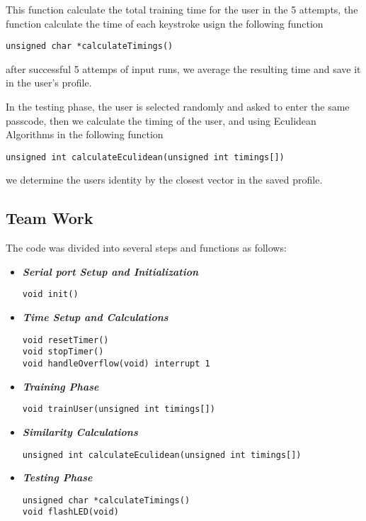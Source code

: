 \documentclass[runningheads]{llncs}
\begin{document}
This function calculate the total training time for the user in the 5 attempts,
the function calculate the time of each keystroke usign the following function
\begin{lstlisting}[style=CStyle]
unsigned char *calculateTimings()
\end{lstlisting}
after successful 5 attemps of input runs, we average the resulting time and save it in the user's profile. \newline \newline 

In the testing phase, the user is selected randomly and asked to enter the same passcode,
then we calculate the timing of the user, and using Eculidean Algorithms in the following function
\begin{lstlisting}[style=CStyle]
unsigned int calculateEculidean(unsigned int timings[])
\end{lstlisting}
we determine the users identity by the closest vector in the saved profile. \newline


\subsection{Team Work}

The code was divided into several steps and functions as follows:
\begin{itemize}
  \setlength\itemsep{2em}

\item \textbf{\textit{Serial port Setup and Initialization}}
\begin{lstlisting}[style=CStyle]
void init()
\end{lstlisting}


\item \textbf{\textit{Time Setup and Calculations}}
\begin{lstlisting}[style=CStyle]
void resetTimer()
void stopTimer()
void handleOverflow(void) interrupt 1
\end{lstlisting}


\item \textbf{\textit{Training Phase}}
\begin{lstlisting}[style=CStyle]
void trainUser(unsigned int timings[])
\end{lstlisting}


\item \textbf{\textit{Similarity Calculations }}
\begin{lstlisting}[style=CStyle]
unsigned int calculateEculidean(unsigned int timings[])
\end{lstlisting}

\item \textbf{\textit{Testing Phase}}
\begin{lstlisting}[style=CStyle]
unsigned char *calculateTimings()
void flashLED(void)
\end{lstlisting}
\end{itemize}
\end{document}
